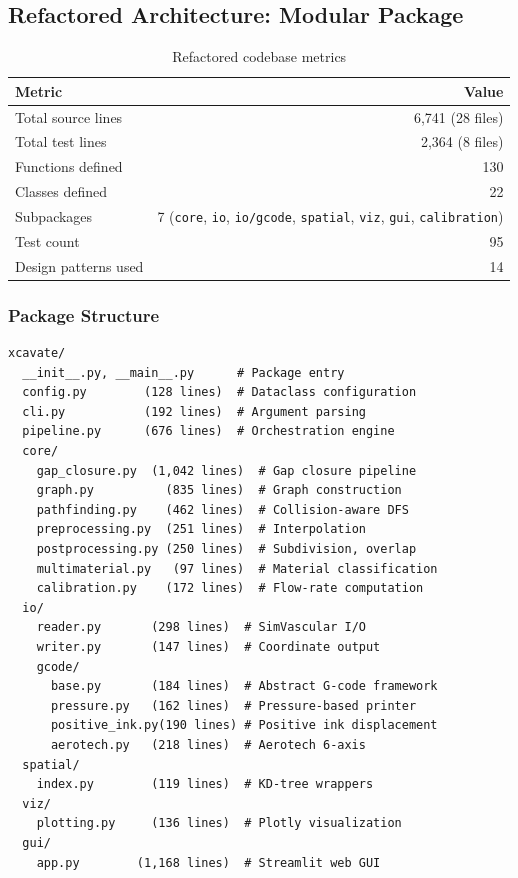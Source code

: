 \documentclass[11pt,a4paper]{article}
\begin{document}
\subsection{Refactored Architecture: Modular Package}

\begin{table}[H]
\centering
\caption{Refactored codebase metrics}
\begin{tabular}{lr}
\toprule
\textbf{Metric} & \textbf{Value} \\
\midrule
Total source lines & 6,741 (28 files) \\
Total test lines & 2,364 (8 files) \\
Functions defined & 130 \\
Classes defined & 22 \\
Subpackages & 7 (\texttt{core}, \texttt{io}, \texttt{io/gcode}, \texttt{spatial}, \texttt{viz}, \texttt{gui}, \texttt{calibration}) \\
Test count & 95 \\
Design patterns used & 14 \\
\bottomrule
\end{tabular}
\end{table}

\subsubsection{Package Structure}

\begin{lstlisting}[language={},numbers=none,basicstyle=\ttfamily\small]
xcavate/
  __init__.py, __main__.py      # Package entry
  config.py        (128 lines)  # Dataclass configuration
  cli.py           (192 lines)  # Argument parsing
  pipeline.py      (676 lines)  # Orchestration engine
  core/
    gap_closure.py  (1,042 lines)  # Gap closure pipeline
    graph.py          (835 lines)  # Graph construction
    pathfinding.py    (462 lines)  # Collision-aware DFS
    preprocessing.py  (251 lines)  # Interpolation
    postprocessing.py (250 lines)  # Subdivision, overlap
    multimaterial.py   (97 lines)  # Material classification
    calibration.py    (172 lines)  # Flow-rate computation
  io/
    reader.py       (298 lines)  # SimVascular I/O
    writer.py       (147 lines)  # Coordinate output
    gcode/
      base.py       (184 lines)  # Abstract G-code framework
      pressure.py   (162 lines)  # Pressure-based printer
      positive_ink.py(190 lines) # Positive ink displacement
      aerotech.py   (218 lines)  # Aerotech 6-axis
  spatial/
    index.py        (119 lines)  # KD-tree wrappers
  viz/
    plotting.py     (136 lines)  # Plotly visualization
  gui/
    app.py        (1,168 lines)  # Streamlit web GUI
\end{lstlisting}
\end{document}
